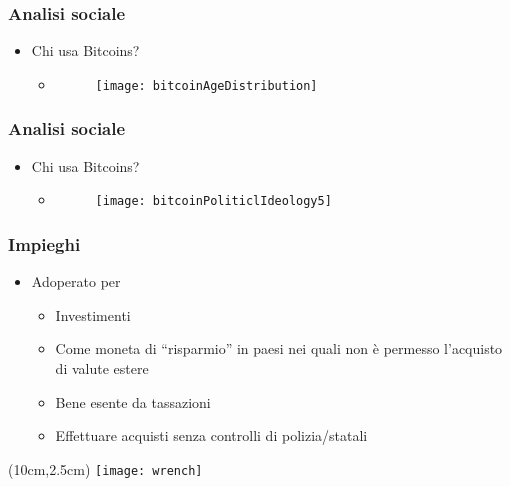 \begin{frame}
 \frametitle{Analisi sociale}

 \begin{itemize}
  \item Chi usa Bitcoins?
  \begin{itemize}
   \item[]
   \begin{figure}
    \centering
    \texttt{[image: bitcoinAgeDistribution]}
   \end{figure}

  \end{itemize}

 \end{itemize}

\end{frame}


\begin{frame}
 \frametitle{Analisi sociale}

 \begin{itemize}
  \item Chi usa Bitcoins?
  \begin{itemize}
   \item[]
   \begin{figure}
    \centering
    \hspace*{-2.5cm}
    \texttt{[image: bitcoinPoliticlIdeology5]}
   \end{figure}

  \end{itemize}

 \end{itemize}

\end{frame}


\begin{frame}
 \frametitle{Impieghi}

 \begin{itemize}
  \item<1-> Adoperato per
  \begin{itemize}
   \item<2-> Investimenti
   \item<3-> Come moneta di ``risparmio'' in paesi nei quali non \`e permesso
l'acquisto di valute estere
   \item<4-> Bene esente da tassazioni
   \item<5-> Effettuare acquisti senza controlli di polizia/statali
  \end{itemize}

 \end{itemize}


 \begin{textblock*}{5cm}(10cm,2.5cm)
  \texttt{[image: wrench]}
 \end{textblock*}

\end{frame}
